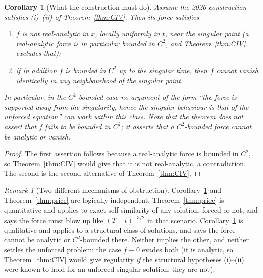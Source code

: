 \documentclass[11pt]{article}
\newtheorem{corollary}[theorem]{Corollary}
\theoremstyle{remark}
\newtheorem{remark}[theorem]{Remark}
\begin{document}
\begin{corollary}[What the construction must do]\label{cor:CIV}
Assume the 2026 construction satisfies (i)--(ii) of Theorem~\ref{thm:CIV}. Then its force
satisfies
\begin{enumerate}[label=(\roman*),leftmargin=*]
\item $f$ is not real-analytic in $x$, locally uniformly in $t$, near the singular point
      (a real-analytic force is in particular bounded in $C^2$, and Theorem~\ref{thm:CIV}
      excludes that);
\item if in addition $f$ is bounded in $C^2$ up to the singular time, then $f$ cannot vanish
      identically in any neighbourhood of the singular point.
\end{enumerate}
In particular, in the $C^2$-bounded case no argument of the form ``the force is supported away
from the singularity, hence the singular behaviour is that of the unforced equation'' can work
within this class. Note that the theorem does \emph{not} assert that $f$ fails to be bounded
in $C^2$; it asserts that a $C^2$-bounded force cannot be analytic or vanish.
\end{corollary}

\begin{proof}
The first assertion follows because a real-analytic force is bounded in $C^2$, so
Theorem~\ref{thm:CIV} would give that it is not real-analytic, a contradiction. The second
is the second alternative of Theorem~\ref{thm:CIV}.
\end{proof}

\begin{remark}[Two different mechanisms of obstruction]\label{rem:twomech}
Corollary~\ref{cor:CIV} and Theorem~\ref{thm:price} are logically independent.
Theorem~\ref{thm:price} is quantitative and applies to exact self-similarity of any solution,
forced or not, and says the force must blow up like $(T-t)^{-3/2}$ in that scenario.
Corollary~\ref{cor:CIV} is qualitative and applies to a structural class of solutions, and
says the force cannot be analytic or $C^2$-bounded there. Neither implies the other, and
neither settles the unforced problem: the case $f\equiv0$ evades both (it is analytic, so
Theorem~\ref{thm:CIV} would give regularity \emph{if} the structural hypotheses (i)--(ii) were
known to hold for an unforced singular solution; they are not).
\end{remark}
\end{document}
